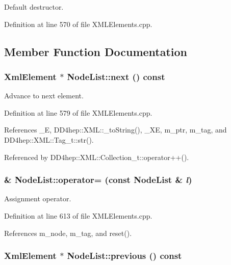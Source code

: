 Default destructor. 

Definition at line 570 of file XMLElements.cpp.

\subsection{Member Function Documentation}
\hypertarget{class_d_d4hep_1_1_x_m_l_1_1_node_list_a81be6bf4c65bb7d5b74ad77d4a66d55e}{
\subsubsection[{next}]{\setlength{\rightskip}{0pt plus 5cm}XmlElement $\ast$ NodeList::next () const}}
\label{class_d_d4hep_1_1_x_m_l_1_1_node_list_a81be6bf4c65bb7d5b74ad77d4a66d55e}


Advance to next element. 

Definition at line 579 of file XMLElements.cpp.

References \_\-E, DD4hep::XML::\_\-toString(), \_\-XE, m\_\-ptr, m\_\-tag, and DD4hep::XML::Tag\_\-t::str().

Referenced by DD4hep::XML::Collection\_\-t::operator++().\hypertarget{class_d_d4hep_1_1_x_m_l_1_1_node_list_a4b07c12f6c886a8400c27797bc85a544}{
\subsubsection[{operator=}]{ \& NodeList::operator= (const {\bf NodeList} \& {\em l})}}
\label{class_d_d4hep_1_1_x_m_l_1_1_node_list_a4b07c12f6c886a8400c27797bc85a544}


Assignment operator. 

Definition at line 613 of file XMLElements.cpp.

References m\_\-node, m\_\-tag, and reset().\hypertarget{class_d_d4hep_1_1_x_m_l_1_1_node_list_aacc9959baf384d70d7e87dab17dd291e}{
\subsubsection[{previous}]{\setlength{\rightskip}{0pt plus 5cm}XmlElement $\ast$ NodeList::previous () const}}
\label{class_d_d4hep_1_1_x_m_l_1_1_node_list_aacc9959baf384d70d7e87dab17dd291e}



